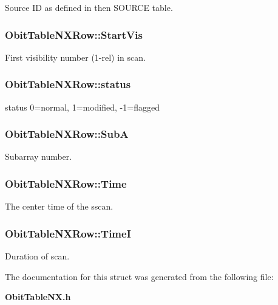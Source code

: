 Source ID as defined in then SOURCE table. 

\subsubsection{ {\bf Obit\-Table\-NXRow::Start\-Vis}}\label{structObitTableNXRow_o10}


First visibility number (1-rel) in scan. 

\subsubsection{ {\bf Obit\-Table\-NXRow::status}}\label{structObitTableNXRow_o13}


status 0=normal, 1=modified, -1=flagged 

\subsubsection{ {\bf Obit\-Table\-NXRow::Sub\-A}}\label{structObitTableNXRow_o9}


Subarray number. 

\subsubsection{ {\bf Obit\-Table\-NXRow::Time}}\label{structObitTableNXRow_o6}


The center time of the sscan. 

\subsubsection{ {\bf Obit\-Table\-NXRow::Time\-I}}\label{structObitTableNXRow_o7}


Duration of scan. 



The documentation for this struct was generated from the following file:\begin{CompactItemize}
\item 
{\bf Obit\-Table\-NX.h}\end{CompactItemize}

